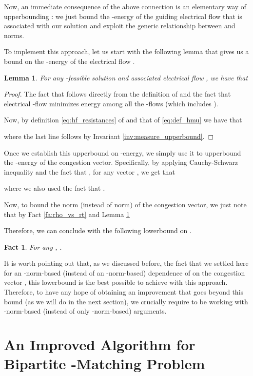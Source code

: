 \documentclass[11pt, letterpaper]{article}
\newtheorem{lemma}[theorem]{Lemma}
\newtheorem{fact}[theorem]{Fact}
\begin{document}
Now, an immediate consequence of the above connection is an elementary way of upperbounding : we just bound the -energy of the guiding electrical flow  that is associated with our solution  and exploit the generic relationship between  and  norms.  

To implement this approach, let us start with the following lemma that gives us a bound on the -energy of the electrical flow . 

\begin{lemma}
\label{lem:hfft_energy_bound}
For any -feasible solution  and associated electrical flow , we have that

\end{lemma}

\begin{proof}
The fact that  follows directly from the definition of  and the fact that electrical -flow minimizes energy among all the -flows (which includes ). 

Now, by definition \eqref{eq:hf_resistances}  of  and that of  \eqref{eq:def_hmu} we have that

where the last line follows by Invariant \ref{inv:measure_upperbound}.
\end{proof}

Once we establish this upperbound on -energy, we simply use it to upperbound the -energy of the congestion vector. Specifically, by applying Cauchy-Schwarz inequality and the fact that , for any vector , we get that

where we also used the fact that . 

Now, to bound the  norm (instead of  norm) of the congestion vector, we just note that by Fact \ref{fa:rho_vs_rt} and Lemma \ref{lem:hfft_energy_bound}
 

Therefore, we can conclude with the following lowerbound on . 

\begin{fact}
\label{fa:basic_delta_lowerbound}
For any , .
\end{fact}

It is worth pointing out that, as we discussed before, the fact that we settled here for an -norm-based (instead of an -norm-based) dependence of  on the congestion vector , this  lowerbound is the best possible to achieve with this approach. Therefore, to have any hope of obtaining an improvement that goes beyond this bound (as we will do in the next section), we crucially require to be working with -norm-based (instead of only -norm-based) arguments. 
  \section{An Improved Algorithm for Bipartite -Matching Problem}
\label{sec:improved}
\end{document}
